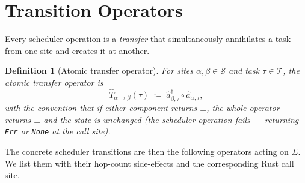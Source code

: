 \documentclass[11pt,a4paper]{report}
\newtheorem{definition}{Definition}[section]
\newcommand{\cre}[1]{\hat{a}^{\dagger}_{#1}}
\newcommand{\ann}[1]{\hat{a}_{#1}}
\newcommand{\Trf}[2]{\hat{T}_{#1 \to #2}}
\newcommand{\code}[1]{\texttt{#1}}
\begin{document}
\section{Transition Operators}

Every scheduler operation is a \emph{transfer} that simultaneously
annihilates a task from one site and creates it at another.

\begin{definition}[Atomic transfer operator]
\label{def:transfer}
For sites $\alpha, \beta \in \mathcal{S}$ and task $\tau \in
\mathcal{T}$, the \emph{atomic transfer operator} is
\[
  \Trf{\alpha}{\beta}(\tau) \;\coloneqq\;
  \cre{\beta,\tau} \circ \ann{\alpha,\tau},
\]
with the convention that if either component returns $\bot$, the
whole operator returns $\bot$ and the state is unchanged (the
scheduler operation fails --- returning \code{Err} or \code{None}
at the call site).
\end{definition}

The concrete scheduler transitions are then the following operators
acting on $\Sigma$.  We list them with their hop-count side-effects
and the corresponding Rust call site.
\end{document}
